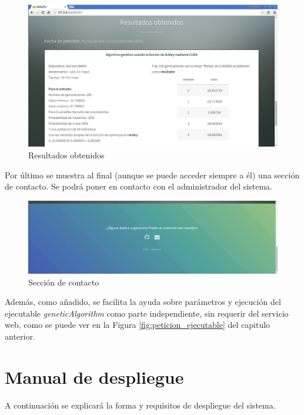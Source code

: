 \bigskip
\begin{figure}[h]
	\centering
	\includegraphics[width=1\linewidth]{../images/captura_web_4}
	\caption[Resultados obtenidos]{Resultados obtenidos}
	\label{fig:captura_web_4}
\end{figure}


\newpage
\bigskip
Por último se muestra al final (aunque se puede acceder siempre a él) una sección de contacto. Se podrá poner en contacto con el administrador del sistema.

\bigskip
\begin{figure}[h]
	\centering
	\includegraphics[width=0.9\linewidth]{../images/captura_web_5}
	\caption[Sección de contacto]{Sección de contacto}
	\label{fig:captura_web_5}
\end{figure}


\bigskip
Además, como añadido, se facilita la ayuda sobre parámetros y ejecución del ejecutable \textit{geneticAlgorithm} como parte independiente, sin requerir del servicio web, como se puede ver en la Figura \ref{fig:peticion_ejecutable} del capitulo anterior.


\newpage
\section{Manual de despliegue}
\bigskip

A continuación se explicará la forma y requisitos de despliegue del sistema. 

